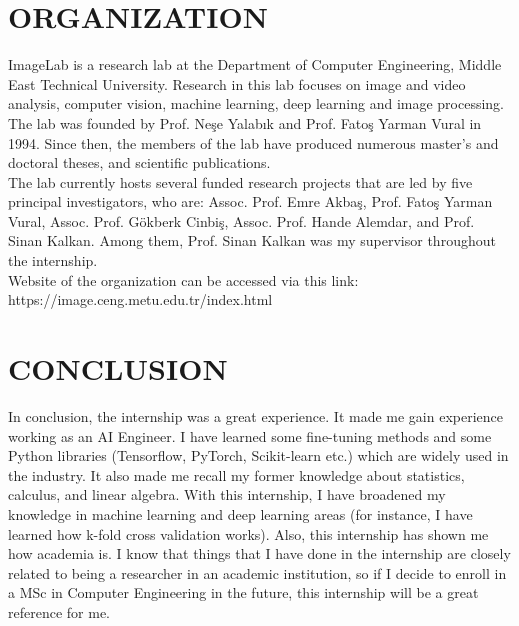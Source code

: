 \documentclass{article}
\begin{document}
\section{ORGANIZATION}
\hspace{0.5cm}
ImageLab is a research lab at the Department of Computer Engineering, Middle East Technical University. Research in this lab focuses on image and video analysis, computer vision, machine learning, deep learning and image processing. The lab was founded by Prof. Neşe Yalabık and Prof. Fatoş Yarman Vural in 1994. Since then, the members of the lab have produced numerous master’s and doctoral theses, and scientific publications.\\

The lab currently hosts several funded research projects that are led by five principal investigators, who are: Assoc. Prof. Emre Akbaş, Prof. Fatoş Yarman Vural, Assoc. Prof. Gökberk Cinbiş, Assoc. Prof. Hande Alemdar, and Prof. Sinan Kalkan. Among them, Prof. Sinan Kalkan was my supervisor throughout the internship.\\

Website of the organization can be accessed via this link:\\ https://image.ceng.metu.edu.tr/index.html
\newpage

\section{CONCLUSION}
\hspace{0.5cm}
In conclusion, the internship was a great experience. It made me gain experience working as an AI Engineer. I have learned some fine-tuning methods and some Python libraries (Tensorflow, PyTorch, Scikit-learn etc.) which are widely used in the industry. It also made me recall my former knowledge about statistics, calculus, and linear algebra. With this internship, I have broadened my knowledge in machine learning and deep learning areas (for instance, I have learned how k-fold cross validation works). Also, this internship has shown me how academia is. I know that things that I have done in the internship are closely related to being a researcher in an academic institution, so if I decide to enroll in a MSc in Computer Engineering in the future, this internship will be a great reference for me.
\newpage
\end{document}
